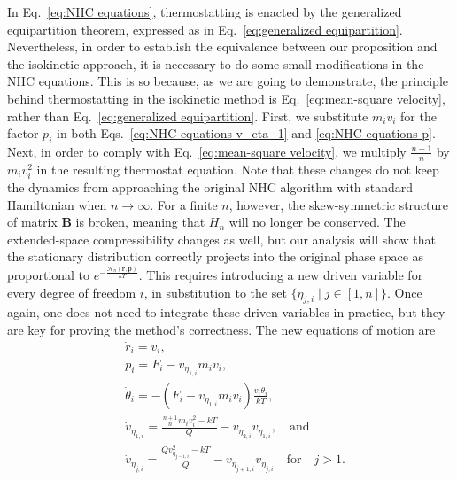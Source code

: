 \documentclass[
aip,
jcp,
reprint,
]{revtex4-1}
\newcommand{\mt}[1]{\boldsymbol{\mathbf{#1}}}          %
\newcommand{\vt}[1]{\boldsymbol{\mathbf{#1}}}          %
\begin{document}
In Eq.~\eqref{eq:NHC equations}, thermostatting is enacted by the generalized equipartition theorem, expressed as in Eq.~\eqref{eq:generalized equipartition}.
Nevertheless, in order to establish the equivalence between our proposition and the isokinetic approach, it is necessary to do some small modifications in the NHC equations.
This is so because, as we are going to demonstrate, the principle behind thermostatting in the isokinetic method is Eq.~\eqref{eq:mean-square velocity}, rather than Eq.~\eqref{eq:generalized equipartition}.
First, we substitute $m_i v_i$ for the factor $p_i$ in both Eqs.~\eqref{eq:NHC equations v_eta_1} and \eqref{eq:NHC equations p}.
Next, in order to comply with Eq.~\eqref{eq:mean-square velocity}, we multiply $\frac{n+1}{n}$ by $m_i v_i^2$ in the resulting thermostat equation.
Note that these changes do not keep the dynamics from approaching the original NHC algorithm with standard Hamiltonian \cite{Martyna_1992} when $n \to \infty$.
For a finite $n$, however, the skew-symmetric structure of matrix $\mt B$ is broken, meaning that $H_n$ will no longer be conserved.
The extended-space compressibility changes as well, but our analysis will show that the stationary distribution correctly projects into the original phase space as proportional to $e^{-\frac{\mathcal{H}_n(\vt r, \vt p)}{kT}}$.
This requires introducing a new driven variable for every degree of freedom $i$, in substitution to the set $\{\eta_{j, i} \mid {j\in[1,n]}\}$.
Once again, one does not need to integrate these driven variables in practice, but they are key for proving the method's correctness.
The new equations of motion are
\begin{subequations}
	\label{eq:isokinetic NHC equations}
	\begin{align}
	&\dot{r}_i = v_i, \\
	&\dot{p}_i = F_i - v_{\eta_{1,i}} m_i v_i, \label{eq:isokinetic NHC equations p} \\
	&\dot{\theta}_i = -\left(F_i - v_{\eta_{1,i}} m_i v_i\right)\frac{v_i \theta_i}{k T}, \label{eq:isokinetic NHC equations theta} \\
	&\dot{v}_{\eta_{1, i}} = \frac{\frac{n+1}{n} m_i v_i^2 - kT}{Q} - v_{\eta_{2, i}} v_{\eta_{1, i}}, \quad \mathrm{and} \label{eq:isokinetic NHC equations v_eta_1} \\
	&\dot{v}_{\eta_{j, i}} = \frac{Q v_{\eta_{j-1, i}}^2 - kT}{Q} - v_{\eta_{j+1, i}} v_{\eta_{j, i}} \quad \mathrm{for} \quad j > 1. \label{eq:adapted NHC equations v_eta_j}
	\end{align}
\end{subequations}
\end{document}
